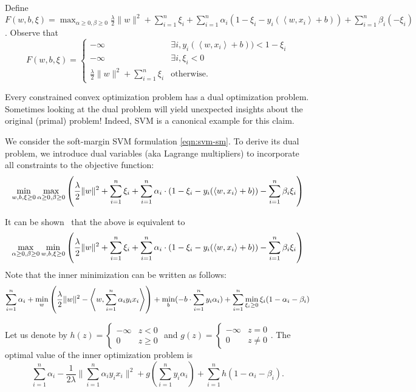 \documentclass{article}
\newcommand{\inner}[2]{\left\langle #1,#2 \right\rangle}
\begin{document}
Define $F(w,b,\xi) = \max_{\alpha \geq 0, \beta \geq 0} \frac \lambda 2 \| w \|^2 + \sum_{i=1}^n \xi_i + \sum_{i=1}^n \alpha_i (1 - \xi_i - y_i(\inner{w}{x_i} + b)) + \sum_{i=1}^n \beta_i (-\xi_i)$. Observe that
\[
F(w,b,\xi) =
\begin{cases}
  -\infty & \exists i, y_i(\inner{w}{x_i} + b)) < 1 - \xi_i \\
  -\infty & \exists i, \xi_i < 0 \\
  \frac \lambda 2 \| w \|^2 + \sum_{i=1}^n \xi_i & \text{otherwise}.
\end{cases}
\]







Every constrained convex optimization problem has a dual optimization problem. Sometimes looking at the dual problem will yield unexpected insights about the original (primal) problem! Indeed, SVM is a canonical example for this claim.

We consider the soft-margin SVM formulation \eqref{eqn:svm-sm}. To derive its dual problem, we introduce dual variables (aka Lagrange multipliers) to incorporate all constraints to the objective function:
\[
\min_{w,b,\xi \geq 0} \max_{\alpha \geq 0, \beta \geq 0} \del{\frac \lambda 2 \| w \|^2 + \sum_{i=1}^n \xi_i + \sum_{i=1}^n \alpha_i \cdot (1 - \xi_i - y_i(\inner{w}{x_i} + b)) - \sum_{i=1}^n \beta_i \xi_i}
\]

It can be shown~ that the above is equivalent to
\[
\max_{\alpha \geq 0, \beta \geq 0} \min_{w,b,\xi \geq 0} \del{\frac \lambda 2 \| w \|^2 + \sum_{i=1}^n \xi_i + \sum_{i=1}^n \alpha_i \cdot (1 - \xi_i - y_i(\inner{w}{x_i} + b)) - \sum_{i=1}^n \beta_i \xi_i}
\]
Note that the inner minimization can be written as follows:
\[ \sum_{i=1}^n \alpha_i + \min_{w} \del{ \frac \lambda 2 \| w \|^2 - \inner{w}{\sum_{i=1}^n \alpha_i y_i x_i}} + \min_{b} (-b \cdot \sum_{i=1}^n y_i \alpha_i) + \sum_{i=1}^n \min_{\xi_i \geq 0} \xi_i(1-\alpha_i-\beta_i) \]

Let us denote by $h(z) = \begin{cases} -\infty & z < 0 \\ 0 & z \geq 0 \end{cases}$
and $g(z) = \begin{cases} -\infty & z = 0 \\ 0 & z \neq 0 \end{cases}$. The optimal value of the inner optimization problem is
\[ \sum_{i=1}^n \alpha_i - \frac{1}{2\lambda} \|\sum_{i=1}^n \alpha_i y_i x_i\|^2 + g(\sum_{i=1}^n y_i \alpha_i) + \sum_{i=1}^n h(1-\alpha_i-\beta_i). \]
\end{document}
